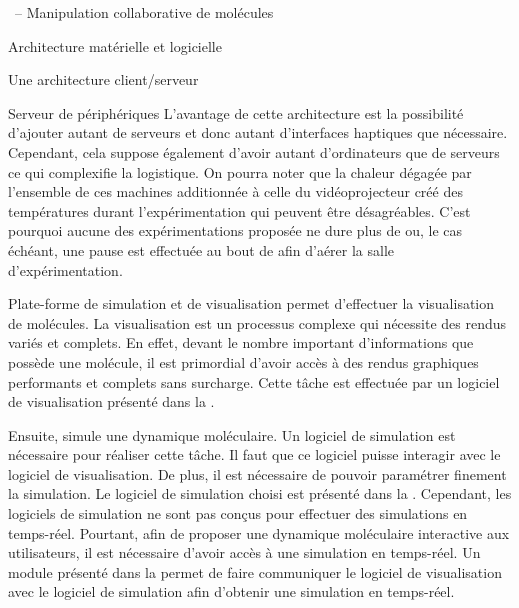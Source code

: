 \documentclass[myfrancais]{mythesis}
\begin{document}
\begin{mychapter}{\myShaddock\ -- Manipulation collaborative de molécules}
\begin{mysection}{Architecture matérielle et logicielle}
\begin{mysubsection}{Une architecture client/serveur}
\begin{mysubsubsection}{Serveur de périphériques}
					L'avantage de cette architecture est la possibilité d'ajouter autant de serveurs et donc autant d'interfaces haptiques que nécessaire.
					Cependant, cela suppose également d'avoir autant d'ordinateurs que de serveurs ce qui complexifie la logistique.
					On pourra noter que la chaleur dégagée par l'ensemble de ces machines additionnée à celle du vidéoprojecteur créé des températures durant l'expérimentation qui peuvent être désagréables.
					C'est pourquoi aucune des expérimentations proposée ne dure plus de  ou, le cas échéant, une pause est effectuée au bout de  afin d'aérer la salle d'expérimentation.
				\end{mysubsubsection}
			\end{mysubsection}
		\end{mysection}
		\begin{mysection}{Plate-forme de simulation et de visualisation}
			\myShaddock permet d'effectuer la visualisation de molécules.
			La visualisation est un processus complexe qui nécessite des rendus variés et complets.
			En effet, devant le nombre important d'informations que possède une molécule, il est primordial d'avoir accès à des rendus graphiques performants et complets sans surcharge.
			Cette tâche est effectuée par un logiciel de visualisation présenté dans la .

			Ensuite, \myShaddock simule une dynamique moléculaire.
			Un logiciel de simulation est nécessaire pour réaliser cette tâche.
			Il faut que ce logiciel puisse interagir avec le logiciel de visualisation.
			De plus, il est nécessaire de pouvoir paramétrer finement la simulation.
			Le logiciel de simulation choisi est présenté dans la .
			Cependant, les logiciels de simulation ne sont pas conçus pour effectuer des simulations en temps-réel.
			Pourtant, afin de proposer une dynamique moléculaire interactive aux utilisateurs, il est nécessaire d'avoir accès à une simulation en temps-réel.
			Un module présenté dans la  permet de faire communiquer le logiciel de visualisation avec le logiciel de simulation afin d'obtenir une simulation en temps-réel.


\end{mysection}
\end{mychapter}
\end{document}
